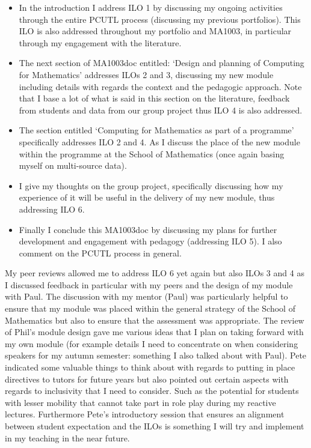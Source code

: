 \documentclass{article}
\begin{document}
\begin{itemize}
    \item In the introduction I address ILO 1 by discussing my ongoing activities through the entire PCUTL process (discussing my previous portfolios). This ILO is also addressed throughout my portfolio and MA1003, in particular through my engagement with the literature.
    \item The next section of MA1003doc entitled: `Design and planning of Computing for Mathematics' addresses ILOs 2 and 3, discussing my new module including details with regards the context and the pedagogic approach. Note that I base a lot of what is said in this section on the literature, feedback from students and data from our group project thus ILO 4 is also addressed.
    \item The section entitled `Computing for Mathematics as part of a programme' specifically addresses ILO 2 and 4. As I discuss the place of the new module within the programme at the School of Mathematics (once again basing myself on multi-source data).
    \item I give my thoughts on the group project, specifically discussing how my experience of it will be useful in the delivery of my new module, thus addressing ILO 6.
    \item Finally I conclude this MA1003doc by discussing my plans for further development and engagement with pedagogy (addressing ILO 5). I also comment on the PCUTL process in general.
\end{itemize}

My peer reviews allowed me to address ILO 6 yet again but also ILOs 3 and 4 as I discussed feedback in particular with my peers and the design of my module with Paul. The discussion with my mentor (Paul) was particularly helpful to ensure that my module was placed within the general strategy of the School of Mathematics but also to ensure that the assessment was appropriate. The review of Phil's module design gave me various ideas that I plan on taking forward with my own module (for example details I need to concentrate on when considering speakers for my autumn semester: something I also talked about with Paul). Pete indicated some valuable things to think about with regards to putting in place directives to tutors for future years but also pointed out certain aspects with regards to inclusivity that I need to consider. Such as the potential for students with lesser mobility that cannot take part in role play during my reactive lectures. Furthermore Pete's introductory session that ensures an alignment between student expectation and the ILOs is something I will try and implement in my teaching in the near future.
\end{document}
